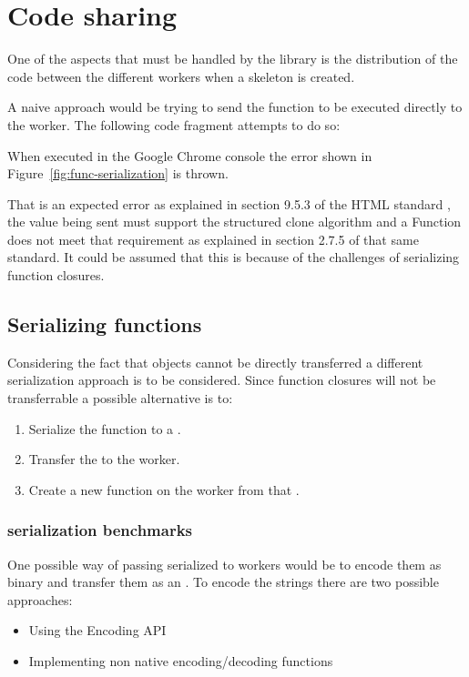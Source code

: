 \section{Code sharing}

One of the aspects that must be handled by the library is the distribution of the code between the different workers when a skeleton is created.

A naive approach would be trying to send the function to be executed directly to the worker. The following code fragment attempts to do so:


When executed in the Google Chrome console the error shown in Figure~\ref{fig:func-serialization} is thrown.

That is an expected error as explained in section 9.5.3 of the HTML standard \cite{html-whatwg}, the value being sent must support the structured clone algorithm and a Function does not meet that requirement as explained in section 2.7.5 of that same standard. It could be assumed that this is because of the challenges of serializing function closures\cite{cloud-haskell}\cite{distributed-scheme}.

\subsection{Serializing functions}
Considering the fact that \tfunction{} objects cannot be directly transferred a different serialization approach is to be considered. Since function closures will not be transferrable a possible alternative is to:
\begin{enumerate}
  \item Serialize the function to a \tstring{}.
  \item Transfer the \tstring{} to the worker.
  \item Create a new function on the worker from that \tstring{}.
\end{enumerate}


\subsubsection{\tstring{} serialization benchmarks}
One possible way of passing serialized \tfunction{} to workers would be to encode them as binary and transfer them as an \tabuffer{}. To encode the strings there are two possible approaches:
\begin{itemize}
  \item Using the Encoding API\cite{encoding-api}
  \item Implementing non native encoding/decoding functions
\end{itemize}

